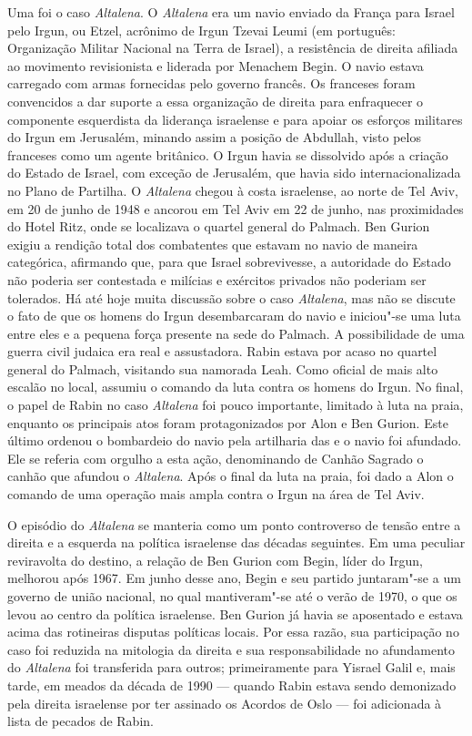Uma foi o caso \emph{Altalena}. O \emph{Altalena} era um navio enviado
da França para Israel pelo Irgun, ou Etzel, acrônimo de Irgun Tzevai
Leumi (em português: Organização Militar Nacional na Terra de Israel), 
a resistência de direita afiliada ao movimento revisionista e
liderada por Menachem Begin. O navio estava carregado com armas
fornecidas pelo governo francês. Os franceses foram convencidos a dar suporte a
essa organização de direita para enfraquecer o componente esquerdista da
liderança israelense e para apoiar os esforços militares do Irgun em
Jerusalém, minando assim a posição de Abdullah, visto pelos franceses
como um agente britânico. O Irgun havia se dissolvido após a criação do
Estado de Israel, com exceção de Jerusalém, que havia sido
internacionalizada no Plano de Partilha. O \emph{Altalena} chegou à
costa israelense, ao norte de Tel Aviv, em 20 de junho de 1948 e ancorou em Tel
Aviv em 22 de junho, nas proximidades do Hotel Ritz, onde se localizava o quartel
general do Palmach. Ben Gurion exigiu a rendição total dos combatentes
que estavam no navio de maneira categórica, afirmando que, para que Israel
sobrevivesse, a autoridade do Estado não poderia ser contestada e
milícias e exércitos privados não poderiam ser tolerados. Há até hoje
muita discussão sobre o caso \emph{Altalena}, mas não se discute o fato
de que os homens do Irgun desembarcaram do navio e iniciou"-se uma luta
entre eles e a pequena força presente na sede do Palmach. A
possibilidade de uma guerra civil judaica era real e assustadora. Rabin
estava por acaso no quartel general do Palmach, visitando sua namorada
Leah. Como oficial de mais alto escalão no local, assumiu o comando da
luta contra os homens do Irgun. No final, o papel de Rabin no caso
\emph{Altalena} foi pouco importante, limitado à luta na praia, enquanto
os principais atos foram protagonizados por Alon e Ben Gurion. Este último
ordenou o bombardeio do navio pela artilharia das  e o navio foi
afundado. Ele se referia com orgulho a esta ação, denominando de Canhão
Sagrado o canhão que afundou o \emph{Altalena}. Após o final da luta na
praia, foi dado a Alon o comando de uma operação mais ampla contra o
Irgun na área de Tel Aviv.

O episódio do \emph{Altalena} se manteria como um ponto controverso de
tensão entre a direita e a esquerda na política israelense das décadas
seguintes. Em uma peculiar reviravolta do destino, a relação de Ben
Gurion com Begin, líder do Irgun, melhorou após 1967. Em junho desse ano,
Begin e seu partido juntaram"-se a um governo de união nacional, no qual
mantiveram"-se até o verão de 1970, o que os levou ao centro da
política israelense. Ben Gurion já havia se aposentado e estava acima
das rotineiras disputas políticas locais. Por essa razão, sua
participação no caso foi reduzida na mitologia da direita
e sua responsabilidade no afundamento do \emph{Altalena} foi transferida
para outros; primeiramente para Yisrael Galil e, mais tarde, em meados da
década de 1990 --- quando Rabin estava sendo demonizado pela direita
israelense por ter assinado os Acordos de Oslo --- foi adicionada à lista
de pecados de Rabin.

